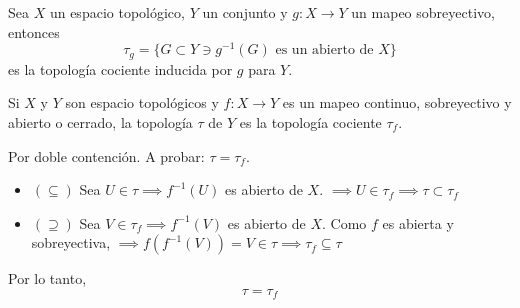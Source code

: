 \begin{definicion}
    Sea $X$ un espacio topológico, $Y$ un conjunto y $g:X\to Y$ un mapeo sobreyectivo, entonces
    $$\tau_g=\{G\subset Y\ni g^{-1}(G) \text{ es un abierto de $X$}\}$$
    es la topología cociente inducida por $g$ para $Y$. 
\end{definicion}
\begin{teorema}
    Si $X$ y $Y$ son espacio topológicos y $f:X\to Y$ es un mapeo continuo, sobreyectivo y abierto o cerrado, la topología $\tau$ de $Y$ es la topología cociente $\tau_f$.
    \begin{dem}
        Por doble contención. A probar: $\tau=\tau_f$. 
        \begin{itemize}
            \item $(\subseteq)$ Sea $U\in \tau\implies f^{-1}(U)$ es abierto de $X$. $\implies U\in \tau_f\implies\tau \subset \tau_f$
            \item $(\supseteq )$ Sea $V\in \tau_f \implies f^{-1}(V)$ es abierto de $X$. Como $f$ es abierta y sobreyectiva, $\implies f(f^{-1}(V))=V\in \tau \implies\tau_f\subseteq \tau$
        \end{itemize}
        Por lo tanto, $$\tau=\tau_f$$
    \end{dem} 
\end{teorema}

